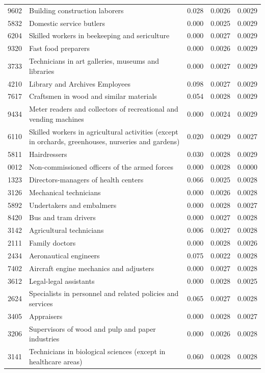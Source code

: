 \begin{longtable}{p{}>{\raggedright\arraybackslash}p{}rrr}
9602 & Building construction laborers & 0.028 & 0.0026 & 0.0029 \\
5832 & Domestic service butlers & 0.000 & 0.0025 & 0.0029 \\
6204 & Skilled workers in beekeeping and sericulture & 0.000 & 0.0027 & 0.0029 \\
9320 & Fast food preparers & 0.000 & 0.0026 & 0.0029 \\
3733 & Technicians in art galleries, museums and libraries & 0.000 & 0.0027 & 0.0029 \\
4210 & Library and Archives Employees & 0.098 & 0.0027 & 0.0029 \\
7617 & Craftsmen in wood and similar materials & 0.054 & 0.0028 & 0.0029 \\
9434 & Meter readers and collectors of recreational and vending machines & 0.000 & 0.0024 & 0.0029 \\
6110 & Skilled workers in agricultural activities (except in orchards, greenhouses, nurseries and gardens) & 0.020 & 0.0029 & 0.0027 \\
5811 & Hairdressers & 0.030 & 0.0028 & 0.0029 \\
0012 & Non-commissioned officers of the armed forces & 0.000 & 0.0028 & 0.0000 \\
1323 & Directors-managers of health centers & 0.066 & 0.0025 & 0.0028 \\
3126 & Mechanical technicians & 0.000 & 0.0026 & 0.0028 \\
5892 & Undertakers and embalmers & 0.000 & 0.0028 & 0.0027 \\
8420 & Bus and tram drivers & 0.000 & 0.0027 & 0.0028 \\
3142 & Agricultural technicians & 0.006 & 0.0027 & 0.0028 \\
2111 & Family doctors & 0.000 & 0.0028 & 0.0026 \\
2434 & Aeronautical engineers & 0.075 & 0.0022 & 0.0028 \\
7402 & Aircraft engine mechanics and adjusters & 0.000 & 0.0027 & 0.0028 \\
3612 & Legal-legal assistants & 0.000 & 0.0028 & 0.0025 \\
2624 & Specialists in personnel and related policies and services & 0.065 & 0.0027 & 0.0028 \\
3405 & Appraisers & 0.000 & 0.0028 & 0.0027 \\
3206 & Supervisors of wood and pulp and paper industries & 0.000 & 0.0026 & 0.0028 \\
3141 & Technicians in biological sciences (except in healthcare areas) & 0.060 & 0.0028 & 0.0028 \\

\end{longtable}
